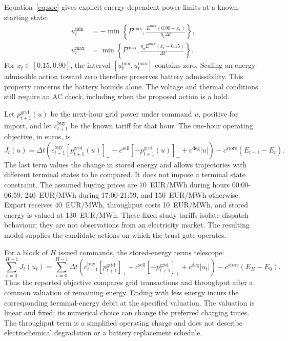 \documentclass[preprint,12pt]{elsarticle}
\newcommand{\pos}[1]{[#1]_{+}}
\begin{document}
Equation~\eqref{eq:soc} gives explicit energy-dependent power limits at a known starting state:
\begin{align}
u_t^{\min}&=-\min\!\left\{P^{\max},
\frac{E^{\max}(0.90-x_t)}{\eta_c\Delta t}\right\},\label{eq:chargebound}\\
u_t^{\max}&=\min\!\left\{P^{\max},
\frac{\eta_dE^{\max}(x_t-0.15)}{\Delta t}\right\}.\label{eq:dischargebound}
\end{align}
For $x_t\in[0.15,0.90]$, the interval $[u_t^{\min},u_t^{\max}]$ contains zero. Scaling an energy-admissible action toward zero therefore preserves battery admissibility. This property concerns the battery bounds alone. The voltage and thermal conditions still require an AC check, including when the proposed action is a hold.


Let $p_{t+1}^{\mathrm{grid}}(u)$ be the next-hour grid power under command $u$, positive for import, and let $c_{t+1}^{\mathrm{buy}}$ be the known tariff for that hour. The one-hour operating objective, in euros, is
\begin{equation}
J_t(u)=\Delta t\left(c_{t+1}^{\mathrm{buy}}\pos{p_{t+1}^{\mathrm{grid}}(u)}
-c^{\mathrm{sell}}\pos{-p_{t+1}^{\mathrm{grid}}(u)}+c^{\mathrm{deg}}|u|\right)
-c^{\mathrm{store}}(E_{t+1}-E_t).
\label{eq:cost}
\end{equation}
The last term values the change in stored energy and allows trajectories with different terminal states to be compared. It does not impose a terminal state constraint. The assumed buying prices are 70~EUR/MWh during hours 00:00-06:59, 240~EUR/MWh during 17:00-21:59, and 150~EUR/MWh otherwise. Export receives 40~EUR/MWh, throughput costs 10~EUR/MWh, and stored energy is valued at 130~EUR/MWh. These fixed study tariffs isolate dispatch behaviour; they are not observations from an electricity market. The resulting model supplies the candidate actions on which the trust gate operates.

For a block of $H$ issued commands, the stored-energy terms telescope:
\begin{equation}
\sum_{t=0}^{H-1}J_t(u_t)=
\sum_{t=0}^{H-1}\Delta t\left(c_{t+1}^{\mathrm{buy}}\pos{p_{t+1}^{\mathrm{grid}}}
-c^{\mathrm{sell}}\pos{-p_{t+1}^{\mathrm{grid}}}+c^{\mathrm{deg}}|u_t|\right)
-c^{\mathrm{store}}(E_H-E_0).
\label{eq:blockcost}
\end{equation}
Thus the reported objective compares grid transactions and throughput after a common valuation of remaining energy. Ending with less energy incurs the corresponding terminal-energy debit at the specified valuation. The valuation is linear and fixed; its numerical choice can change the preferred charging times. The throughput term is a simplified operating charge and does not describe electrochemical degradation or a battery replacement schedule.
\end{document}
